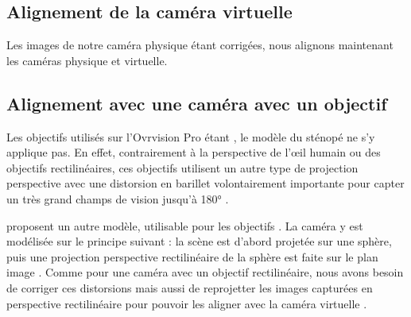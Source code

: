 \subsection{Alignement de la caméra virtuelle}
\label{subsec:virtual_camera_alignement}
Les images de notre caméra physique étant corrigées, nous alignons maintenant les caméras physique et virtuelle.



\subsection{Alignement avec une caméra avec un objectif }
\label{subsec:fisheye_camera_calibration}

Les objectifs utilisés sur l'Ovrvision Pro étant , le modèle du sténopé ne s'y applique pas. En effet, contrairement à la perspective de l'\oe il humain ou des objectifs rectilinéaires, ces objectifs utilisent un autre type de projection perspective avec une distorsion en barillet volontairement importante pour capter un très grand champs de vision jusqu'à \ang{180} .


\cite{Mei2007} proposent un autre modèle, utilisable pour les objectifs . La caméra y est modélisée sur le principe suivant : la scène est d'abord projetée sur une sphère, puis une projection perspective rectilinéaire de la sphère est faite sur le plan image . Comme pour une caméra avec un objectif rectilinéaire, nous avons besoin de corriger ces distorsions mais aussi de reprojetter les images capturées en perspective rectilinéaire pour pouvoir les aligner avec la caméra virtuelle .


